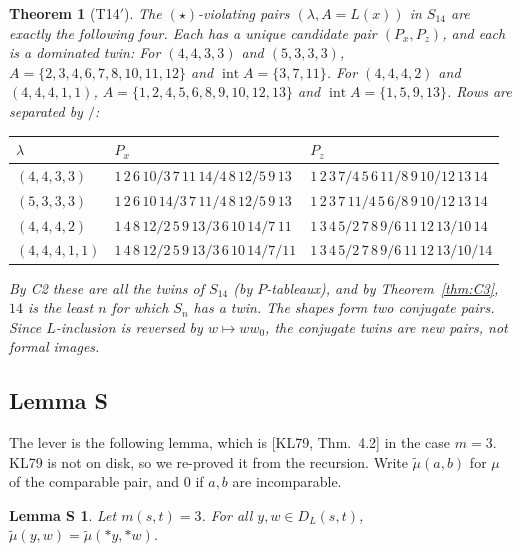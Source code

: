 \documentclass[11pt]{amsart}
\newtheorem{theorem}{Theorem}[section]
\newtheorem*{lemmaS}{Lemma S}
\theoremstyle{definition}
\theoremstyle{remark}
\newcommand{\intr}{\operatorname{int}}
\newcommand{\tmu}{\tilde\mu}
\begin{document}
\begin{theorem}[T14$'$]
The $(\star)$-violating pairs $(\lambda,A=L(x))$ in $S_{14}$ are exactly the following four. Each has a unique candidate pair $(P_x,P_z)$, and each is a dominated twin:
For $(4,4,3,3)$ and $(5,3,3,3)$, $A=\{2,3,4,6,7,8,10,11,12\}$ and $\intr A=\{3,7,11\}$. For $(4,4,4,2)$ and $(4,4,4,1,1)$, $A=\{1,2,4,5,6,8,9,10,12,13\}$ and $\intr A=\{1,5,9,13\}$. Rows are separated by $/$:
\begin{center}\small
\begin{tabular}{@{}lll@{}}\toprule
$\lambda$ & $P_x$ & $P_z$\\\midrule
$(4,4,3,3)$ & $1\,2\,6\,10/3\,7\,11\,14/4\,8\,12/5\,9\,13$ & $1\,2\,3\,7/4\,5\,6\,11/8\,9\,10/12\,13\,14$\\
$(5,3,3,3)$ & $1\,2\,6\,10\,14/3\,7\,11/4\,8\,12/5\,9\,13$ & $1\,2\,3\,7\,11/4\,5\,6/8\,9\,10/12\,13\,14$\\
$(4,4,4,2)$ & $1\,4\,8\,12/2\,5\,9\,13/3\,6\,10\,14/7\,11$ & $1\,3\,4\,5/2\,7\,8\,9/6\,11\,12\,13/10\,14$\\
$(4,4,4,1,1)$ & $1\,4\,8\,12/2\,5\,9\,13/3\,6\,10\,14/7/11$ & $1\,3\,4\,5/2\,7\,8\,9/6\,11\,12\,13/10/14$\\\bottomrule
\end{tabular}
\end{center}
By C2 these are all the twins of $S_{14}$ (by $P$-tableaux), and by Theorem~\ref{thm:C3}, $14$ is the least $n$ for which $S_n$ has a twin. The shapes form two conjugate pairs. Since $L$-inclusion is reversed by $w\mapsto ww_0$, the conjugate twins are new pairs, not formal images.
\end{theorem}

\subsection*{Lemma S}
The lever is the following lemma, which is [KL79, Thm.~4.2] in the case $m=3$. KL79 is not on disk, so we re-proved it from the recursion. Write $\tmu(a,b)$ for $\mu$ of the comparable pair, and $0$ if $a,b$ are incomparable.

\begin{lemmaS}
Let $m(s,t)=3$. For all $y,w\in D_L(s,t)$, $\tmu(y,w)=\tmu({*y},{*w})$.
\end{lemmaS}
\end{document}
